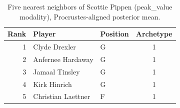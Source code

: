 \begin{table}[htbp]
  \centering\small
  \begin{tabular}{rllc}
    \toprule
    Rank & Player & Position & Archetype \\
    \midrule
    1 & Clyde Drexler & G & 1 \\
    2 & Anfernee Hardaway & G & 1 \\
    3 & Jamaal Tinsley & G & 1 \\
    4 & Kirk Hinrich & G & 1 \\
    5 & Christian Laettner & F & 1 \\
    \bottomrule
  \end{tabular}
  \caption{Five nearest neighbors of Scottie Pippen (peak_value modality), Procrustes-aligned posterior mean.}
  \label{tab:Scottie_Pippen_neighbors_peak_value}
\end{table}

